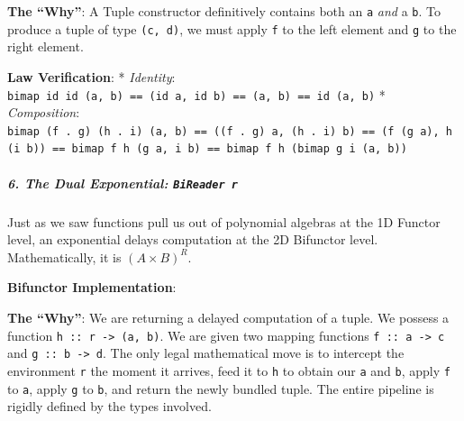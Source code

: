 \documentclass[
]{article}
\newenvironment{Shaded}{}{}
\newcommand{\DataTypeTok}[1]{\textcolor[rgb]{0.56,0.13,0.00}{#1}}
\newcommand{\KeywordTok}[1]{\textcolor[rgb]{0.00,0.44,0.13}{\textbf{#1}}}
\newcommand{\NormalTok}[1]{#1}
\newcommand{\OperatorTok}[1]{\textcolor[rgb]{0.40,0.40,0.40}{#1}}
\newcommand{\OtherTok}[1]{\textcolor[rgb]{0.00,0.44,0.13}{#1}}
\begin{document}
\textbf{The ``Why''}: A Tuple constructor definitively contains both an
\texttt{a} \emph{and} a \texttt{b}. To produce a tuple of type
\texttt{(c,\ d)}, we must apply \texttt{f} to the left element and
\texttt{g} to the right element.

\textbf{Law Verification}: * \emph{Identity}:
\texttt{bimap\ id\ id\ (a,\ b)\ ==\ (id\ a,\ id\ b)\ ==\ (a,\ b)\ ==\ id\ (a,\ b)}
* \emph{Composition}:
\texttt{bimap\ (f\ .\ g)\ (h\ .\ i)\ (a,\ b)\ ==\ ((f\ .\ g)\ a,\ (h\ .\ i)\ b)\ ==\ (f\ (g\ a),\ h\ (i\ b))\ ==\ bimap\ f\ h\ (g\ a,\ i\ b)\ ==\ bimap\ f\ h\ (bimap\ g\ i\ (a,\ b))}

\subparagraph{\texorpdfstring{6. The Dual Exponential:
\texttt{BiReader\ r}}{6. The Dual Exponential: BiReader r}}\label{the-dual-exponential-bireader-r}

Just as we saw functions pull us out of polynomial algebras at the 1D
Functor level, an exponential delays computation at the 2D Bifunctor
level. Mathematically, it is \((A \times B)^R\).

\textbf{Bifunctor Implementation}:

\begin{Shaded}
\end{Shaded}

\textbf{The ``Why''}: We are returning a delayed computation of a tuple.
We possess a function \texttt{h\ ::\ r\ -\textgreater{}\ (a,\ b)}. We
are given two mapping functions \texttt{f\ ::\ a\ -\textgreater{}\ c}
and \texttt{g\ ::\ b\ -\textgreater{}\ d}. The only legal mathematical
move is to intercept the environment \texttt{r} the moment it arrives,
feed it to \texttt{h} to obtain our \texttt{a} and \texttt{b}, apply
\texttt{f} to \texttt{a}, apply \texttt{g} to \texttt{b}, and return the
newly bundled tuple. The entire pipeline is rigidly defined by the types
involved.
\end{document}
